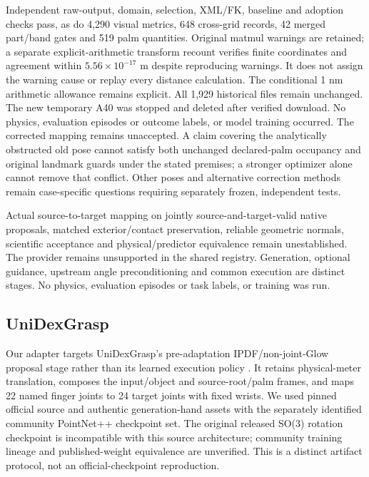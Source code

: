 \documentclass[10pt,letterpaper]{article}
\begin{document}
Independent raw-output, domain, selection, XML/FK, baseline and adoption checks
pass, as do 4,290 visual metrics, 648 cross-grid records, 42 merged part/band
gates and 519 palm quantities. Original matmul warnings are retained; a separate
explicit-arithmetic transform recount verifies finite coordinates and agreement
within $5.56\times10^{-17}$ m despite reproducing warnings. It does not assign
the warning cause or replay every distance calculation. The conditional 1 nm
arithmetic allowance remains explicit. All 1,929 historical files remain
unchanged. The new temporary A40 was stopped and deleted after verified download.
No physics, evaluation episodes or outcome labels, or model training occurred.
The corrected mapping remains unaccepted. A claim covering the analytically
obstructed old pose cannot satisfy both unchanged declared-palm occupancy and
original landmark guards under the stated premises; a stronger optimizer alone
cannot remove that conflict. Other poses and alternative correction methods
remain case-specific questions requiring separately frozen, independent tests.


Actual source-to-target mapping on jointly source-and-target-valid native
proposals, matched exterior/contact preservation, reliable geometric normals, scientific acceptance
and physical/predictor equivalence remain unestablished. The provider remains
unsupported in the shared registry. Generation, optional guidance, upstream angle
preconditioning and common execution are distinct stages. No physics, evaluation
episodes or task labels, or training was run.

\subsection{UniDexGrasp}
Our adapter targets UniDexGrasp's pre-adaptation IPDF/non-joint-Glow proposal
stage rather than its learned execution policy \cite{unidex}. It retains
physical-meter translation, composes the input/object and source-root/palm
frames, and maps 22 named finger joints to 24 target joints with fixed wrists.
We used pinned official source and authentic generation-hand assets with the
separately identified community PointNet++ checkpoint set. The original released
SO(3) rotation checkpoint is incompatible with this source architecture;
community training lineage and published-weight equivalence are unverified.
This is a distinct artifact protocol, not an official-checkpoint reproduction.
\end{document}

